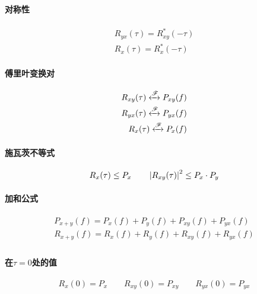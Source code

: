     \paragraph{对称性}
    \begin{align}
        R_{yx}(\tau)=R_{xy}^*(-\tau)\\
        R_x(\tau)=R_x^*(-\tau)
    \end{align}
    \paragraph{傅里叶变换对}
    \begin{align}
        R_{xy}(\tau)\xleftrightarrow[]{\mathscr{F}}P_{xy}(f)\\
        R_{yx}(\tau)\xleftrightarrow[]{\mathscr{F}}P_{yx}(f)\\
        R_x(\tau)\xleftrightarrow[]{\mathscr{F}}P_x(f)
    \end{align}
    \paragraph{施瓦茨不等式}
    \begin{equation}
        R_x(\tau)\leq P_x\hspace{2em}\left\vert R_{xy}(\tau) \right\vert^2\leq P_x\cdot P_y
    \end{equation}
    \paragraph{加和公式}
    \begin{align}
        P_{x+y}(f)=P_x(f)+P_y(f)+P_{xy}(f)+P_{yx}(f)\\
        R_{x+y}(f)=R_x(f)+R_y(f)+R_{xy}(f)+R_{yx}(f)\\
    \end{align}
    \paragraph{在$\tau=0$处的值}
    \begin{equation}
        R_x(0)=P_x\hspace{2em}R_{xy}(0)=P_{xy}\hspace{2em}R_{yx}(0)=P_{yx}
    \end{equation}
